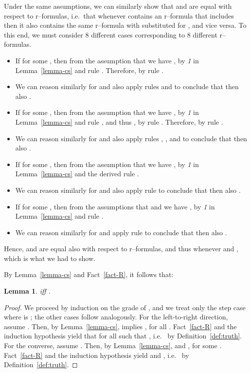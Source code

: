 \documentclass[times, 10pt]{article}
\newtheorem{lemma}{Lemma}
\begin{document}
\begin{figure*}[t]
\begin{itemize}
Under the same assumptions, we can similarly show that  and  are equal with 
respect to r--formulas, i.e.~that whenever  contains an r--formula that includes  then it also contains the same r--formula with  substituted for , and vice versa. 
To this end, we must consider 8 different cases corresponding to 8 different r--formulas. 
\begin{itemize}
\item If  for some , then from the assumption that 
 we have , 
by \emph{1} in Lemma~\ref{lemma-cs} and rule . Therefore, 
 by rule .  
\item We can reason similarly for  and also apply rules  
and  to conclude that then also . 
\item If  for some , then from the assumption that 
 we have , 
by \emph{1} in Lemma~\ref{lemma-cs} and rule , and thus 
, by rule . Therefore, 
 by rule .  
\item We can reason similarly for  and also apply rules ,
, and  to conclude that then also . 
\item If  for some , then from the assumption that 
 we have ,
by \emph{1} in Lemma~\ref{lemma-cs} and the derived rule .
\item We can reason similarly for  and also apply rule 
to conclude that then also . 
\item If  for some , then from the assumptions that 
 and  we have 
, by \emph{1} in Lemma~\ref{lemma-cs} and rule .  
\item We can reason similarly for  and apply rule 
to conclude that then also . 
\end{itemize}
Hence,  and  are equal also with respect to r--formulas, and thus
 whenever  and , which is what we had to show.
\end{itemize}

By Lemma~\ref{lemma-cs} and Fact~\ref{fact-R}, it follows that:
\begin{lemma}\label{lemma-truth}
   iff .
\end{lemma}
\begin{proof}
  We proceed by induction on the grade of , and we treat only the step case where 
   is ; the other cases follow analogously. For the left-to-right direction, 
  assume .  Then, by Lemma~\ref{lemma-cs}, 
   implies , for all .
  Fact~\ref{fact-R} and the induction hypothesis yield that 
   for all 
   such that , 
  i.e.~ by Definition~\ref{def:truth}.
  For the converse, assume .  Then, by
  Lemma~\ref{lemma-cs},  and , for 
  some . Fact~\ref{fact-R} and the induction hypothesis yield
   and 
  , 
  i.e.~ by Definition~\ref{def:truth}.
\end{proof}


\end{figure*}
\end{document}
